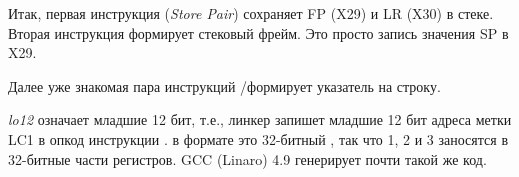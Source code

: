 

Итак, первая инструкция  (\emph{Store Pair}) сохраняет \ac{FP} (X29) и \ac{LR} (X30) в стеке.
Вторая инструкция  формирует стековый фрейм.
Это просто запись значения \ac{SP} в X29.

Далее уже знакомая пара инструкций /\ADD формирует указатель на строку.

\emph{lo12} означает младшие 12 бит, т.е., линкер запишет младшие 12 бит адреса метки LC1 в опкод инструкции \ADD.
 в формате \printf это 32-битный \Tint, так что 1, 2 и 3 заносятся в 32-битные части регистров.
\Optimizing GCC (Linaro) 4.9 генерирует почти такой же код.

